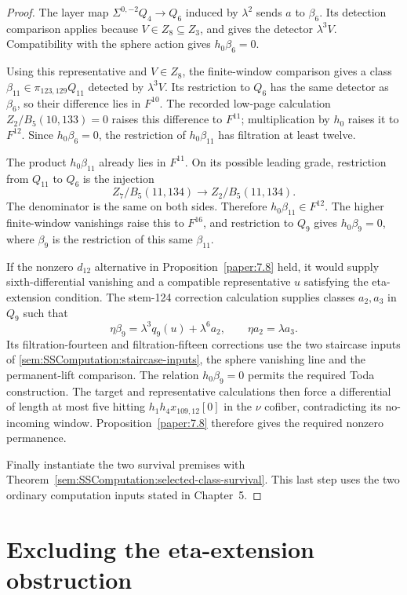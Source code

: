 \begin{proof}
The layer map $\Sigma^{0,-2}Q_4\to Q_6$ induced by $\lambda^2$ sends
$a$ to $\beta_6$. Its detection comparison applies because
$V\in Z_8\subseteq Z_3$, and gives the detector $\lambda^3V$.
Compatibility with the sphere action gives $h_0\beta_6=0$.

Using this representative and $V\in Z_8$, the finite-window comparison
gives a class
$\beta_{11}\in\pi_{123,129}Q_{11}$ detected by $\lambda^3V$.
Its restriction to $Q_6$ has the same detector as $\beta_6$, so their
difference lies in $F^{10}$. The recorded low-page calculation
$Z_2/B_5(10,133)=0$ raises this difference to $F^{11}$; multiplication
by $h_0$ raises it to $F^{12}$. Since $h_0\beta_6=0$, the restriction
of $h_0\beta_{11}$ has filtration at least twelve.

The product $h_0\beta_{11}$ already lies in $F^{11}$. On its possible
leading grade, restriction from $Q_{11}$ to $Q_6$ is the injection
\[
 Z_7/B_5(11,134)\longrightarrow Z_2/B_5(11,134).
\]
The denominator is the same on both sides. Therefore
$h_0\beta_{11}\in F^{12}$. The higher finite-window vanishings raise
this to $F^{16}$, and restriction to $Q_9$ gives $h_0\beta_9=0$,
where $\beta_9$ is the restriction of this same $\beta_{11}$.

If the nonzero $d_{12}$ alternative in Proposition~\ref{paper:7.8}
held, it would supply sixth-differential vanishing and a compatible
representative $u$ satisfying the eta-extension condition. The
stem-124 correction calculation supplies classes $a_2,a_3$ in $Q_9$
such that
\[
 \eta\beta_9=\lambda^3q_9(u)+\lambda^6a_2,
 \qquad \eta a_2=\lambda a_3.
\]
Its filtration-fourteen and filtration-fifteen corrections use the
two staircase inputs of \ref{sem:SSComputation:staircase-inputs},
the sphere vanishing line and the permanent-lift comparison.
The relation $h_0\beta_9=0$ permits the required Toda construction.
The target and representative calculations then force a differential of
length at most five hitting $h_1h_4x_{109,12}[0]$ in the $\nu$ cofiber,
contradicting its no-incoming window. Proposition~\ref{paper:7.8} therefore
gives the required nonzero permanence.

Finally instantiate the two survival premises with
Theorem~\ref{sem:SSComputation:selected-class-survival}. This last step uses the
two ordinary computation inputs stated in Chapter~5.
\end{proof}

\section{Excluding the eta-extension obstruction}

